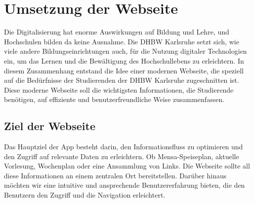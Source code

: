 \chapter{Umsetzung der Webseite}
Die Digitalisierung hat enorme Auswirkungen auf Bildung und Lehre, und Hochschulen bilden da keine Ausnahme. Die DHBW Karlsruhe setzt sich, wie viele andere Bildungseinrichtungen auch, für die Nutzung digitaler Technologien ein, um das Lernen und die Bewältigung des Hochschullebens zu erleichtern. In diesem Zusammenhang entstand die Idee einer modernen Webseite, die speziell auf die Bedürfnisse der Studierenden der DHBW Karlsruhe zugeschnitten ist. Diese moderne Webseite soll die wichtigsten Informationen, die Studierende benötigen, auf effiziente und benutzerfreundliche Weise zusammenfassen.\\
\section{Ziel der Webseite}
Das Hauptziel der App besteht darin, den Informationsfluss zu optimieren und den Zugriff auf relevante Daten zu erleichtern. Ob Mensa-Speiseplan, aktuelle Vorlesung, Wochenplan oder eine Ansammlung von Links. Die Webseite sollte all diese Informationen an einem  zentralen Ort bereitstellen. Darüber hinaus möchten wir eine intuitive und ansprechende Benutzererfahrung bieten, die den Benutzern den Zugriff und die Navigation erleichtert.\\
\newpage

